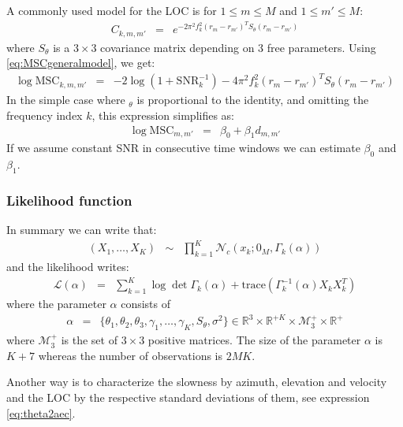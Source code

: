 \documentclass[a4paper, 12pt]{report}
\newcommand{\trace}[1]{\mathrm{trace}\left( #1 \right)}
\def\SNR{\mathrm{SNR}}
\def\MSC{\mathrm{MSC}}
\begin{document}
A commonly used model for the LOC is for $1\leq m\leq M$ and $1\leq m'\leq M$:
\begin{eqnarray}
 \label{eq:CkwithGauss}
 C_{k,m,m'} &=&e^{-2\pi^2f_k^2(r_{m}-r_{m'})^TS_{\theta}(r_{m}-r_{m'})}
\end{eqnarray}
where $S_{\theta}$ is a $3\times 3$ covariance matrix depending on 3 free parameters. Using \eqref{eq:MSCgeneralmodel}, we get:
\begin{eqnarray*}
\label{eq:MSCgaussianmodel}
 \log \MSC_{k,m,m'}&=& -2 \log(1+\SNR_{k}^{-1})
-4\pi^2f_k^2(r_{m}-r_{m'})^TS_{\theta}(r_{m}-r_{m'})
\end{eqnarray*}
In the simple case where $_{\theta}$ is proportional to the identity, and omitting the frequency index $k$, this expression simplifies as:
\begin{eqnarray*}
\label{eq:MSCgaussianmodel}
 \log \MSC_{m,m'}&=& \beta_{0}+\beta_{1} d_{m,m'}
\end{eqnarray*}
If we assume constant SNR in consecutive time windows we can estimate $\beta_0$ and $\beta_1$.


\subsubsection{Likelihood function}
In summary   we can write that:
\begin{eqnarray*}
 (X_{1},\ldots,X_{K}) &\sim&\prod_{k=1}^{K}\mathcal{N}_{c}(x_{k};0_{M},\Gamma_{k}(\alpha))
\end{eqnarray*}
and the likelihood writes:
\begin{eqnarray}
 \label{eq:likelihood-function}
 \mathcal{L}(\alpha)&=&
 \sum_{k=1}^{K}\log\det\Gamma_{k}(\alpha)+\trace{\Gamma_{k}^{-1}(\alpha)X_{k}X_{k}^{T}}
\end{eqnarray}
where the parameter $\alpha$ consists of
\begin{eqnarray}
\alpha&=&
\{
\theta_{1},\theta_{2},\theta_{3},\gamma_{1},\ldots,\gamma_{K},S_{\theta},\sigma^{2}
\}
\in \mathds{R}^{3}\times\mathds{R}^{+K}\times   \mathcal{M}_{3}^{+}\times \mathds{R}^{+}
\end{eqnarray}
where $\mathcal{M}_{3}^{+}$ is the set of $3\times 3$ positive matrices. The size of the parameter $\alpha$ is $K+7$ whereas the number of observations is $2MK$.


Another way is to characterize the slowness by azimuth, elevation and velocity and the LOC by the respective standard deviations of them, see expression \eqref{eq:theta2aec}.
\end{document}
